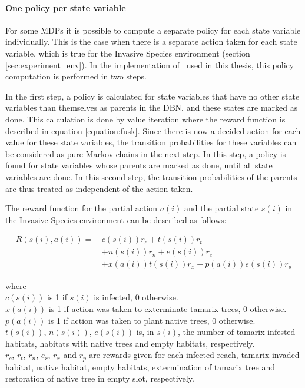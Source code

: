 \paragraph{One policy per state variable}
\label{sec:one_policy_per_state_variable}

For some MDPs it is possible to compute a separate policy for each state
variable individually. This is the case when there is a separate action taken
for each state variable, which is true for the Invasive Species environment
(section \ref{sec:experiment_env}). In the implementation of \etre\ used in
this thesis, this policy computation is performed in two steps. 

In the first step, a policy is calculated for state variables that have no
other state variables than themselves as parents in the DBN, and these states
are marked as done. This calculation is done by value iteration where the reward function
is described in equation \eqref{equation:fusk}. Since there is now a decided action for each value for
these state variables, the transition probabilities for these variables can be
considered as pure Markov chains in the next step. In this step, a policy is
found for state variables whose parents are marked as done, until all state
variables are done. In this second step, the transition probabilities of the
parents are thus treated as independent of the action taken.

The reward function for the partial action $a(i)$ and the partial state $s(i)$ in the Invasive Species environment can be described as follows:

\begin{align}
\label{equation:fusk}
R(s(i),a(i)) = \, 
 & c(s(i)) r_c + t(s(i)) r_t  \nonumber \\
 & + n(s(i)) r_n + e(s(i)) r_e   \nonumber \\
 & +  x(a(i)) t(s(i)) r_x + p(a(i)) e(s(i)) r_p
\end{align}

where \\
$c(s(i))$ is 1 if $s(i)$ is infected, 0 otherwise. \\
$x(a(i))$ is 1 if action was taken to exterminate tamarix trees, 0 otherwise. \\
$p(a(i))$ is 1 if action was taken to plant native trees, 0 otherwise. \\
$t(s(i))$, $n(s(i))$, $e(s(i))$ is, in $s(i)$, the number of tamarix-infested habitats, habitats with native trees and empty habitats, respectively. \\
$r_c$, $r_t$, $r_n$, $e_r$, $r_x$ and $r_p$ are rewards given for each infected reach, tamarix-invaded habitat, native habitat, empty habitats, extermination of tamarix tree and restoration of native tree in empty slot, respectively.

